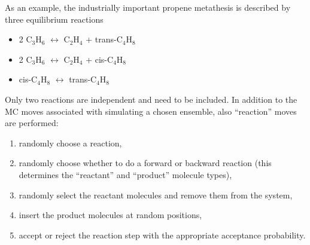 As an example, the industrially important propene metathesis is described by three equilibrium reactions
\begin{itemize}
\item{2 C$_3$H$_6$ $\leftrightarrow$ C$_2$H$_4$ + trans-C$_4$H$_8$}
\item{2 C$_3$H$_6$ $\leftrightarrow$ C$_2$H$_4$ + cis-C$_4$H$_8$}
\item{cis-C$_4$H$_8$ $\leftrightarrow$ trans-C$_4$H$_8$}
\end{itemize}
Only two reactions are independent and need to be included. In addition to the MC moves associated with
simulating a chosen ensemble, also ``reaction'' moves are performed:
\begin{enumerate}
\item{randomly choose a reaction,}
\item{randomly choose whether to do a forward or backward reaction (this determines the ``reactant'' and ``product'' molecule types),}
\item{randomly select the reactant molecules and remove them from the system},
\item{insert the product molecules at random positions},
\item{accept or reject the reaction step with the appropriate acceptance probability.}
\end{enumerate}

